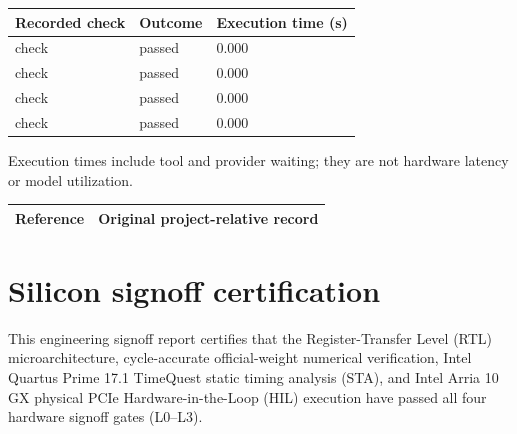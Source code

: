 \documentclass[11pt,a4paper]{article}
\begin{document}
{\small\renewcommand{\arraystretch}{1.18}\begin{longtable}{@{}L{0.57\textwidth}|L{0.16\textwidth}|L{0.17\textwidth}@{}}\toprule

\textbf{Recorded check} & \textbf{Outcome} & \textbf{Execution time (\allowbreak{}s)\allowbreak{}}\\\midrule\endhead

check & passed & 0.000\\[2pt]\hline

check & passed & 0.000\\[2pt]\hline

check & passed & 0.000\\[2pt]\hline

check & passed & 0.000\\[2pt]\hline

\bottomrule\end{longtable}}

Execution times include tool and provider waiting; they are not hardware latency or model utilization.

{\small\renewcommand{\arraystretch}{1.18}\begin{longtable}{@{}L{0.12\textwidth}|L{0.82\textwidth}@{}}\toprule

\textbf{Reference} & \textbf{Original project-relative record}\\\midrule\endhead

\bottomrule\end{longtable}}

\section{Silicon signoff certification}

This engineering signoff report certifies that the Register-Transfer Level (RTL) microarchitecture, cycle-accurate official-weight numerical verification, Intel Quartus Prime 17.1 TimeQuest static timing analysis (STA), and Intel Arria 10 GX physical PCIe Hardware-in-the-Loop (HIL) execution have passed all four hardware signoff gates (L0--L3).
\end{document}

